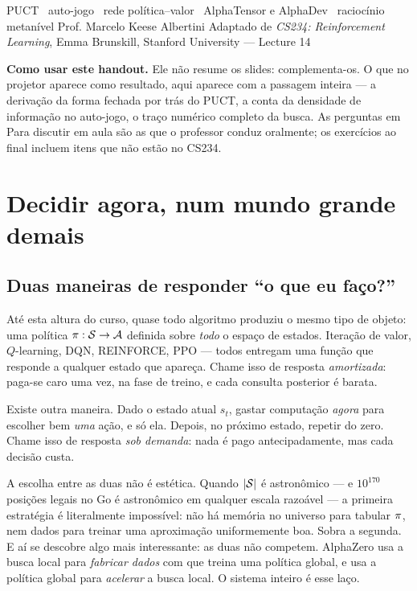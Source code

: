 \documentclass[11pt]{article}
\begin{document}
     {PUCT \textbullet\ auto-jogo \textbullet\ rede política--valor \textbullet\
      AlphaTensor e AlphaDev \textbullet\ raciocínio metanível}
     {Prof. Marcelo Keese Albertini}
     {Adaptado de \emph{CS234: Reinforcement Learning}, Emma Brunskill, Stanford University — Lecture 14}

\begin{ideiabox}
\textbf{Como usar este handout.} Ele não resume os slides: complementa-os. O que
no projetor aparece como resultado, aqui aparece com a passagem inteira — a
derivação da forma fechada por trás do PUCT, a conta da densidade de informação
no auto-jogo, o traço numérico completo da busca. As perguntas em
\textsf{Para discutir em aula} são as que o professor conduz oralmente; os
exercícios ao final incluem itens que não estão no CS234.
\end{ideiabox}

\section{Decidir agora, num mundo grande demais}

\subsection{Duas maneiras de responder ``o que eu faço?''}

Até esta altura do curso, quase todo algoritmo produziu o mesmo tipo de objeto:
uma política $\pi : \mathcal{S} \to \mathcal{A}$ definida sobre \emph{todo} o espaço de estados.
Iteração de valor, $Q$-learning, DQN, REINFORCE, PPO — todos entregam uma função
que responde a qualquer estado que apareça. Chame isso de resposta
\emph{amortizada}: paga-se caro uma vez, na fase de treino, e cada consulta
posterior é barata.

Existe outra maneira. Dado o estado atual $s_t$, gastar computação \emph{agora}
para escolher bem \emph{uma} ação, e só ela. Depois, no próximo estado, repetir do
zero. Chame isso de resposta \emph{sob demanda}: nada é pago antecipadamente, mas
cada decisão custa.

A escolha entre as duas não é estética. Quando $\lvert\mathcal{S}\rvert$ é astronômico — e
$10^{170}$ posições legais no Go é astronômico em qualquer escala razoável — a
primeira estratégia é literalmente impossível: não há memória no universo para
tabular $\pi$, nem dados para treinar uma aproximação uniformemente boa. Sobra a
segunda. E aí se descobre algo mais interessante: as duas não competem. AlphaZero
usa a busca local para \emph{fabricar dados} com que treina uma política global, e
usa a política global para \emph{acelerar} a busca local. O sistema inteiro é esse
laço.
\end{document}
